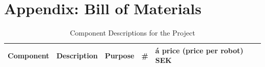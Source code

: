 \appendix


\section{Appendix: Bill of Materials}
\label{appendix:bom}
  
\begin{center}
    \begin{longtable}{|p{3cm}|p{3cm}|p{3cm}|p{1cm}|p{3cm}| }
        \caption{Component Descriptions for the Project} \label{tab:bom} \\
        \hline
        \rowcolor{gray!50} \textbf{Component} & \textbf{Description} & \textbf{Purpose} & \textbf{\#} & \textbf{á price (price per robot) SEK}\\ \endfirsthead 
        \hline


\end{longtable}
\end{center}
